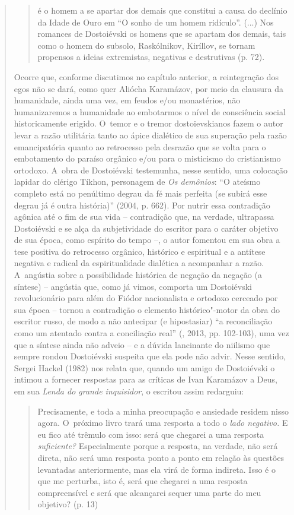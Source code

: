 {\begin{quote}
\begin{quote}
é o homem a se apartar dos demais que constitui a causa do declínio da
Idade de Ouro em ``O sonho de um homem ridículo''. (...) Nos romances de
Dostoiévski os homens que se apartam dos demais, tais como o homem do
subsolo, Raskólnikov, Kiríllov, se tornam propensos a ideias
extremistas, negativas e destrutivas (p. 72).
\end{quote}

Ocorre que, conforme discutimos no capítulo anterior, a reintegração dos
egos não se dará, como quer Aliócha Karamázov, por meio da clausura da
humanidade, ainda uma vez, em feudos e/ou monastérios, não humanizaremos
a humanidade ao embotarmos o nível de consciência social historicamente
erigido. O~temor e o tremor dostoievskianos fazem o autor levar a razão
utilitária tanto ao ápice dialético de sua superação pela razão
emancipatória quanto ao retrocesso pela desrazão que se volta para o
embotamento do paraíso orgânico e/ou para o misticismo do cristianismo
ortodoxo. A~obra de Dostoiévski testemunha, nesse sentido, uma colocação
lapidar do clérigo Tíkhon, personagem de \emph{Os demônios}: ``O ateísmo
completo está no penúltimo degrau da fé mais perfeita (se subirá esse
degrau já é outra história)'' (2004, p. 662). Por nutrir essa
contradição agônica até o fim de sua vida -- contradição que, na
verdade, ultrapassa Dostoiévski e se alça da subjetividade do escritor
para o caráter objetivo de sua época, como espírito do tempo --, o autor
fomentou em sua obra a tese positiva do retrocesso orgânico, histórico e
espiritual e a antítese negativa e radical da espiritualidade dialética
a acompanhar a razão. A~angústia sobre a possibilidade histórica de
negação da negação (a síntese) -- angústia que, como já vimos, comporta
um Dostoiévski revolucionário para além do Fiódor nacionalista e
ortodoxo cerceado por sua época -- tornou a contradição o elemento
histórico"-motor da obra do escritor russo, de modo a não antecipar (e
hipostasiar) ``a reconciliação como um atentado contra a conciliação
real'' (, 2013, pp. 102-103), uma vez que a síntese ainda não
adveio -- e a dúvida lancinante do niilismo que sempre rondou
Dostoiévski suspeita que ela pode não advir. Nesse sentido, Sergei
Hackel (1982) nos relata que, quando um amigo de Dostoiévski o intimou a
fornecer respostas para as críticas de Ivan Karamázov a Deus, em sua
\emph{Lenda do grande inquisidor}, o escritou assim redarguiu:

\begin{quote}
Precisamente, e toda a minha preocupação e ansiedade residem nisso
agora. O~próximo livro trará uma resposta a todo o \emph{lado negativo.}
E eu fico até trêmulo com isso: será que chegarei a uma resposta
\emph{suficiente?} Especialmente porque a resposta, na verdade, não será
direta, não será uma resposta ponto a ponto em relação às questões
levantadas anteriormente, mas ela virá de forma indireta. Isso é o que
me perturba, isto é, será que chegarei a uma resposta compreensível e
será que alcançarei sequer uma parte do meu objetivo? (p. 13)
\end{quote}


\end{quote}}
